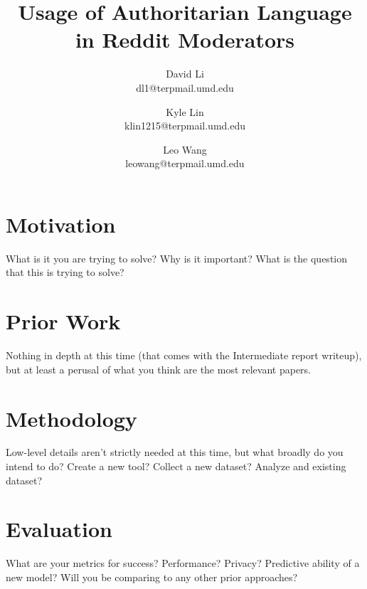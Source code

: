 \documentclass[letterpaper,twocolumn,10pt]{article}
\begin{document}

\date{}

\title{\Large \bf Usage of Authoritarian Language in Reddit Moderators}

\author{ %
{\rm David Li}\\
dl1@terpmail.umd.edu
\and
{\rm Kyle Lin}\\
klin1215@terpmail.umd.edu
\and
{\rm Leo Wang}\\
leowang@terpmail.umd.edu
}

\maketitle

\section{Motivation}

What is it you are trying to solve?
Why is it important?
What is the question that this is trying to solve?

\section{Prior Work}

Nothing in depth at this time (that comes with the Intermediate report writeup), but at least a perusal of what you think are the most relevant papers.

\section{Methodology}

Low-level details aren't strictly needed at this time, but what broadly do you intend to do? Create a new tool? Collect a new dataset? Analyze and existing dataset?

\section{Evaluation}

What are your metrics for success? Performance? Privacy? Predictive ability of a new model?
Will you be comparing to any other prior approaches?

\end{document}
